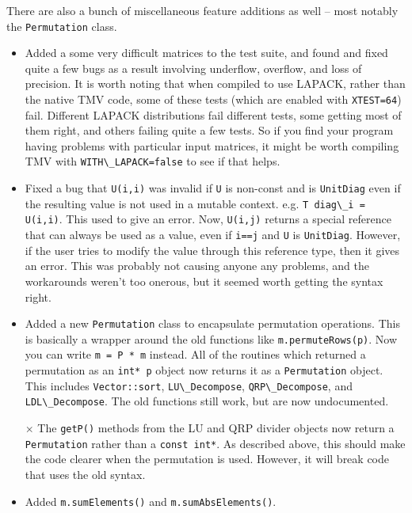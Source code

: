 \documentclass[twoside,letterpaper,11pt]{article}
\renewcommand{\tt}[1]{{\lstinline {#1}}}
\begin{document}
\begin{description}
There are also a bunch of miscellaneous feature additions as well -- most notably the \tt{Permutation} class.

\begin{itemize}

\item Added a some very difficult matrices to the test suite, and found and fixed quite a few 
bugs as a result involving underflow, overflow, and loss of precision.  It is worth noting that
when compiled to use LAPACK, rather than the native TMV code, some of these tests
(which are enabled with \tt{XTEST=64}) fail.  Different LAPACK distributions fail different tests, some getting most of them right, and others failing quite a few tests.  So if you find your program having problems with particular input matrices, it might be worth compiling TMV with \tt{WITH\_LAPACK=false} to see if that helps.

\item Fixed a bug that \tt{U(i,i)} was invalid if \tt{U} is non-const and is \tt{UnitDiag} even 
if the resulting value is not used in a mutable context.  
e.g. \tt{T diag\_i = U(i,i)}.  This used to give an error.  Now, \tt{U(i,j)} returns a special reference
that can always be used as a value, even if \tt{i==j} and \tt{U} is \tt{UnitDiag}.  
However, if the user tries to modify the value through this reference type, then it gives
an error.  This was probably not causing anyone any problems, and the workarounds 
weren't too onerous, but it seemed worth getting the syntax right.

\item Added a new \tt{Permutation} class to encapsulate permutation operations.  
This is basically a wrapper around the old functions
like \tt{m.permuteRows(p)}.  Now you can write \tt{m = P * m} instead.  All of the routines
which returned a permutation as an \tt{int* p} object now returns it as a \tt{Permutation} object.
This includes \tt{Vector::sort}, \tt{LU\_Decompose}, \tt{QRP\_Decompose}, and 
\tt{LDL\_Decompose}.  The old functions still work, but are now undocumented.

\item[$\times$] The \tt{getP()} methods from the LU and QRP divider objects now return
a \tt{Permutation} rather than a \tt{const int*}.  As described above, this should make the 
code clearer when the permutation is used.  However, it will break code that uses 
the old syntax.

\item Added \tt{m.sumElements()} and \tt{m.sumAbsElements()}.


\end{itemize}
\end{description}
\end{document}
